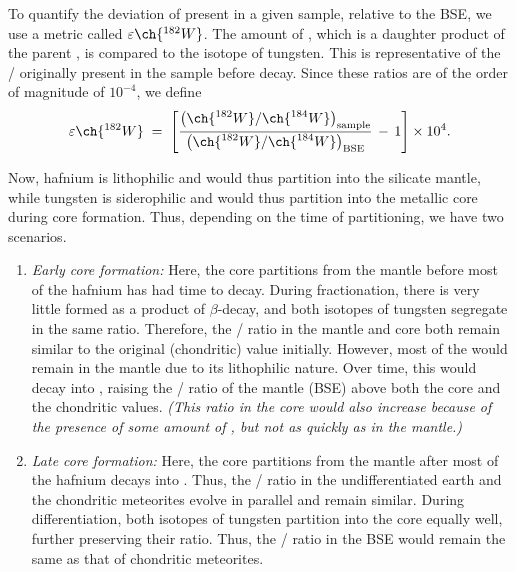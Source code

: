 \documentclass[10pt]{article}
\begin{document}
        To quantify the deviation of  present in a given sample, relative to the BSE, we use a metric called $\varepsilon\ch{^{182}W}$.
        The amount of , which is a daughter product of the parent , is compared to the  isotope of tungsten.
        This is representative of the / originally present in the sample before decay. Since these ratios are of
        the order of magnitude of $10^{-4}$, we define
        \[
        \varepsilon\ch{^{182}W} \;=\; \left[\frac{\left(\displaystyle{\ch{^{182}W}}/{\ch{^{184}W}}\right)_\text{sample}}
                                                {\left(\displaystyle{\ch{^{182}W}}/{\ch{^{184}W}}\right)_\text{BSE}}
                                                \,-\, 1\right] \times 10^4.
        \]

        Now, hafnium is lithophilic and would thus partition into the silicate mantle, while tungsten is siderophilic and would thus partition
        into the metallic core during core formation. Thus, depending on the time of partitioning, we have two scenarios.
        \begin{enumerate}[label=(\roman*), itemsep=0pt, topsep=\parsep]
        \item \textit{Early core formation:} Here, the core partitions from the mantle before most of the hafnium has had time to decay.
                During fractionation, there is very little  formed as a product of $\beta$-decay, and both isotopes of tungsten
                segregate in the same ratio.
                Therefore, the / ratio in the mantle and core both remain similar to the original (chondritic) value initially.
                However, most of the  would remain in the mantle due to its lithophilic nature. Over time, this would
                decay into , raising the / ratio of the mantle (BSE) above both the core and the chondritic values.
                {\it (This ratio in the core would also increase because of the presence of some amount of , but not as quickly
                as in the mantle.)}

        \item \textit{Late core formation:} Here, the core partitions from the mantle after most of the hafnium decays into .
                Thus, the / ratio in the undifferentiated earth and the chondritic meteorites evolve in parallel
                and remain similar. During differentiation, both isotopes of tungsten partition into the core equally well, further
                preserving their ratio. Thus, the / ratio in the BSE would remain the same as that of chondritic meteorites.
        \end{enumerate}
\end{document}
